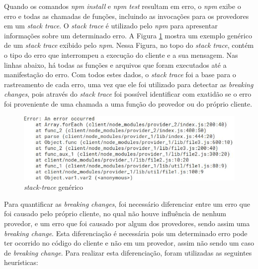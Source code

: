 Quando os comandos \textit{npm install} e \textit{npm test} resultam em erro, o \textit{npm} exibe o erro e todas as chamadas de funções, incluindo as invocações para os provedores em um \textit{stack trace}. O \textit{stack trace} é utilizado pelo \textit{npm} para apresentar informações sobre um determinado erro. A Figura \ref{fig:trace} mostra um exemplo genérico de um \textit{stack trace} exibido pelo \textit{npm}. Nessa Figura, no topo do \textit{stack trace}, contém o tipo do erro que interrompeu a execução do cliente e a sua mensagem. Nas linhas abaixo, há todas as funções e arquivos que foram executados até a manifestação do erro. Com todos estes dados, o \textit{stack trace} foi a base para o rastreamento de cada erro, uma vez que ele foi utilizado para detectar as \textit{breaking changes}, pois através do \textit{stack trace} foi possível identificar com exatidão se o erro foi proveniente de uma chamada a uma função do provedor ou do próprio cliente.

\begin{figure}
    \centering
    \includegraphics[scale=0.7]{figuras/stack_trace.jpeg}
    \caption{\textit{stack-trace} genérico}
    \label{fig:trace}
\end{figure}{}

Para quantificar as \textit{breaking changes}, foi necessário diferenciar entre um erro que foi causado pelo próprio cliente, no qual não houve influência de nenhum provedor, e um erro que foi causado por algum dos provedores, sendo assim uma \textit{breaking change}. Esta diferenciação é necessária pois um determinado erro pode ter ocorrido no código do cliente e não em um provedor, assim não sendo um caso de \textit{breaking change}. Para realizar esta diferenciação, foram utilizadas as seguintes heurísticas:

